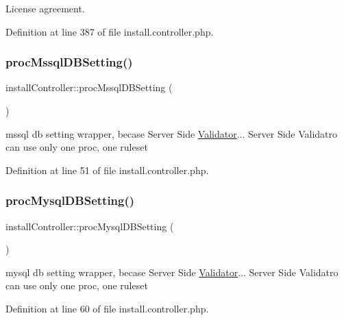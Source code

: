 License agreement. 



Definition at line 387 of file install.\+controller.\+php.

\hypertarget{classinstallController_a583b9b74e93bf6a762a7bd6d08e2b23a}{}\label{classinstallController_a583b9b74e93bf6a762a7bd6d08e2b23a} 
\subsubsection{\texorpdfstring{proc\+Mssql\+D\+B\+Setting()}{procMssqlDBSetting()}}
{\footnotesize\ttfamily install\+Controller\+::proc\+Mssql\+D\+B\+Setting (\begin{DoxyParamCaption}{ }\end{DoxyParamCaption})}



mssql db setting wrapper, becase Server Side \hyperlink{classValidator}{Validator}... Server Side Validatro can use only one proc, one ruleset 



Definition at line 51 of file install.\+controller.\+php.

\hypertarget{classinstallController_a9d46a8423a90109be5dc1edf8238630e}{}\label{classinstallController_a9d46a8423a90109be5dc1edf8238630e} 
\subsubsection{\texorpdfstring{proc\+Mysql\+D\+B\+Setting()}{procMysqlDBSetting()}}
{\footnotesize\ttfamily install\+Controller\+::proc\+Mysql\+D\+B\+Setting (\begin{DoxyParamCaption}{ }\end{DoxyParamCaption})}



mysql db setting wrapper, becase Server Side \hyperlink{classValidator}{Validator}... Server Side Validatro can use only one proc, one ruleset 



Definition at line 60 of file install.\+controller.\+php.

